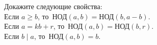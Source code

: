 





\setcounter{jeolmsubproblem}{0}%
Докажите следующие свойства:
\\
\subproblem
Если $a \geq b$, то~$\text{НОД}(a, b) = \text{НОД}(b, a - b)$.
\\
\subproblem
Если $a = k b + r$, то~$\text{НОД}(a, b) = \text{НОД}(b, r)$.
\\
\subproblem
Если $b \mid a$, то~$\text{НОД}(a,b) = b$.

